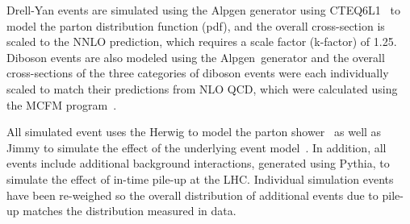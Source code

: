 
Drell-Yan events are simulated using the {\sc Alpgen} generator using
CTEQ6L1 \cite{Pumplin:2002vw}\ to model the parton distribution function (pdf),
and the overall cross-section is scaled to the NNLO prediction, which
requires a scale factor (k-factor) of 1.25.
Diboson events are also modeled using the {\sc Alpgen}\ generator
and the overall cross-sections of the three categories of diboson events
were each individually scaled to match their predictions from NLO QCD,
which were calculated using the MCFM program~\cite{Campbell:1999ah}.


All simulated event uses the {\sc Herwig} to model the parton shower~\cite{herwig1,Corcella:2002jc}
as well as {\sc Jimmy} to simulate the effect of the underlying event model~\cite{JButterworth:1996zw}.
In addition, all events include additional background interactions, generated using Pythia,
to simulate the effect of in-time pile-up at the LHC.
Individual simulation events have been re-weighed so the overall distribution of
additional events due to pile-up matches the distribution measured in data.

